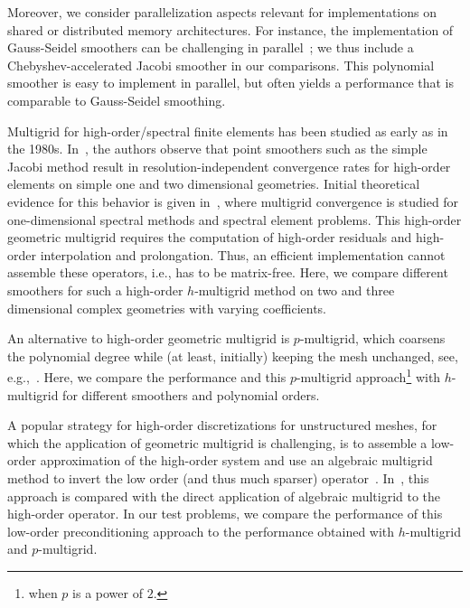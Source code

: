 \documentclass[smallcondensed,final]{svjour3}     %
\begin{document}
Moreover, we consider parallelization aspects relevant for implementations on
shared or distributed memory architectures. For instance, the implementation of
Gauss-Seidel smoothers can be challenging in
parallel~\cite{AdamsBrezinaHuEtAl03, BakerFalgoutKolevEtAl11}; we thus include
a Chebyshev-accelerated Jacobi smoother in our comparisons. This polynomial
smoother is easy to implement in parallel, but often yields a performance that
is comparable to Gauss-Seidel smoothing.


Multigrid for high-order/spectral finite elements has been studied as early as
in the 1980s. In~\cite{RonquistPatera87}, the authors observe that point
smoothers such as the simple Jacobi method result in resolution-independent
convergence rates for high-order elements on simple one and two dimensional
geometries. Initial theoretical evidence for this behavior is given
in~\cite{MadayMunoz88}, where multigrid convergence is studied for
one-dimensional spectral methods and spectral element problems. This high-order
geometric multigrid requires the computation of high-order residuals and
high-order interpolation and prolongation. Thus, an efficient implementation
cannot assemble these operators, i.e., has to be matrix-free.  Here, we compare
different smoothers for such a high-order $h$-multigrid method on two and three
dimensional complex geometries with varying coefficients.

An alternative to high-order geometric multigrid is $p$-multigrid, which
coarsens the polynomial degree while (at least, initially) keeping the mesh
unchanged, see, e.g.,~\cite{HelenbrookMavriplisAtkins03}. Here, we compare the
performance and this $p$-multigrid approach\footnote{when $p$ is a power of
$2$.} with $h$-multigrid for different smoothers and polynomial orders.


A popular strategy for high-order discretizations for unstructured meshes, for
which the application of geometric multigrid is challenging, is to assemble a
low-order approximation of the high-order system and use an algebraic multigrid
method to invert the low order (and thus much sparser) operator~\cite{Brown10,
Kim07, DevilleMund90, Olson07, CanutoGervasioQuarteroni10}.
In~\cite{HeysManteuffelMcCormickEtAl05}, this approach is compared with the
direct application of algebraic multigrid to the high-order operator.  In our
test problems, we compare the performance of this low-order preconditioning
approach to the performance obtained with $h$-multigrid and $p$-multigrid.
\end{document}
